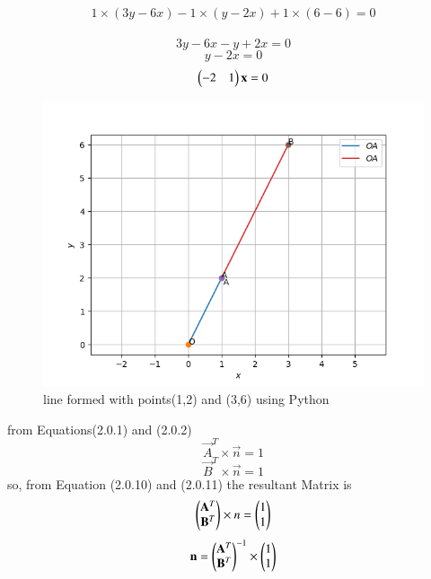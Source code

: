 \documentclass[journal,12pt,twocolumn]{IEEEtran}
\begin{document}
 \begin{equation}\label{equation6}
{1 \times (3y-6x) -1 \times(y-2x)+ 1 \times(6-6)}=0 
\end{equation}\\
\begin{equation}\label{equation6}
3y-6x-y+2x=0
\end{equation}
\begin{equation}\label{equation7}
 y-2x=0
\end{equation}
\begin{equation}\label{equation8}
\begin{pmatrix}-2 & 1\end{pmatrix} \mathbf{x}= 0 
\end{equation}
\begin{figure}[H]
\centering
\includegraphics[width=\columnwidth]{Figure_1.png}
\caption{line formed with points(1,2) and (3,6) using Python}
\label{fig:1}
\end{figure}
from Equations(2.0.1) and (2.0.2)
\begin{equation}
\vec{A}^T \times \vec n = 1
\end{equation}
\begin{equation}
\vec{B}^T \times \vec n = 1 
\end{equation}
so, from Equation (2.0.10) and (2.0.11) the resultant Matrix is \\
\begin{equation}
\begin{pmatrix}{\mathbf{A}^T} \\ {\mathbf{B}^T}\end{pmatrix} \times n = \begin{pmatrix}1\\1\end{pmatrix} 
\end{equation}
\begin{equation}
\mathbf{n}=\begin{pmatrix}\mathbf{A}^T \\ \mathbf{B}^T\end{pmatrix}^{-1} \times \begin{pmatrix}1\\1\end{pmatrix}
\end{equation}
\end{document}
